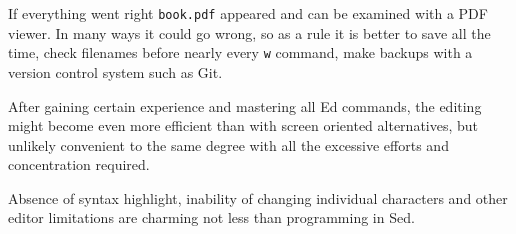 If everything went right \lstinline{book.pdf} appeared and can be examined
with a PDF viewer.
In many ways it could go wrong, so as a rule it is better to save all the time,
check filenames before nearly every \lstinline{w} command, make backups with
a version control system such as Git.

After gaining certain experience and mastering all Ed commands,
the editing might become even more efficient than with screen oriented
alternatives, but unlikely convenient to the same degree
with all the excessive efforts and concentration
required.

Absence of syntax highlight, inability of changing individual characters and
other editor limitations are charming not less than programming in Sed.
